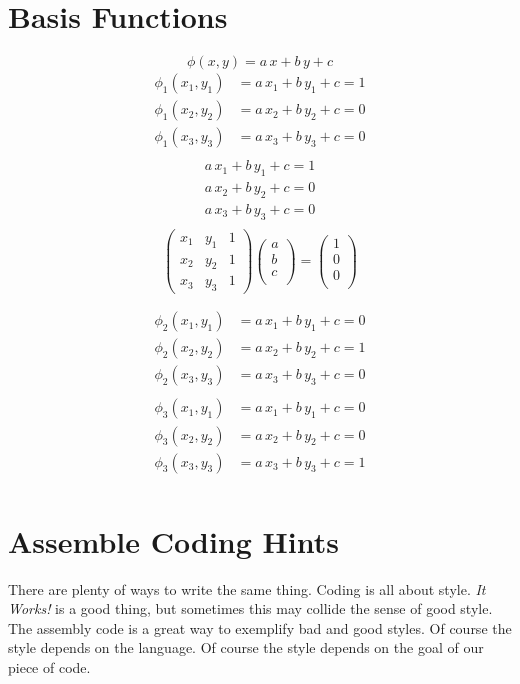 \documentclass[11pt]{amsart}
\begin{document}
\section{Basis Functions}
\[
\phi(x,y) = a\, x + b\, y + c
\]
\begin{align*}
\phi_1(x_1,y_1)  & =  a\, x_1 + b\, y_1 + c  =  1 \\
\phi_1(x_2,y_2)  & =  a\, x_2 + b\, y_2 + c  =  0 \\
\phi_1(x_3,y_3)  & =  a\, x_3 + b\, y_3 + c  =  0 \\
\end{align*}
\begin{align*}
  a\, x_1 + b\, y_1 + c  =  1 \\
  a\, x_2 + b\, y_2 + c  =  0 \\
  a\, x_3 + b\, y_3 + c  =  0 \\
\end{align*}
\[
\left(
\begin{array}{ccc}
x_1 & y_1 & 1 \\
x_2 & y_2 & 1 \\
x_3 & y_3 & 1 
\end{array}
\right)
\left(
\begin{array}{c}
a\\
b\\
c\\
\end{array}
\right) =
\left(
\begin{array}{c}
1\\
0\\
0\\
\end{array}
\right)
\]


\begin{align*}
\phi_2(x_1,y_1)  & =  a\, x_1 + b\, y_1 + c  =  0 \\
\phi_2(x_2,y_2)  & =  a\, x_2 + b\, y_2 + c  =  1 \\
\phi_2(x_3,y_3)  & =  a\, x_3 + b\, y_3 + c  =  0 \\
\end{align*}
\begin{align*}
\phi_3(x_1,y_1)  & =  a\, x_1 + b\, y_1 + c  =  0 \\
\phi_3(x_2,y_2)  & =  a\, x_2 + b\, y_2 + c  =  0 \\
\phi_3(x_3,y_3)  & =  a\, x_3 + b\, y_3 + c  =  1 \\
\end{align*}

\section{Assemble Coding Hints}
There are plenty of ways to write the same thing. Coding is all about 
style. \emph{It Works!} is a good thing, but sometimes this may collide 
the sense of good style. The assembly code is a great way to exemplify 
bad and good styles. Of course the style depends on the language. 
Of course the style depends on the goal of our piece of code. 
\end{document}
